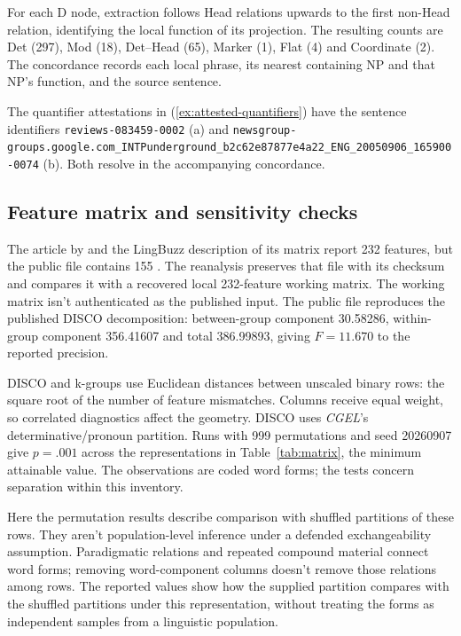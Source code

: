 \documentclass[12pt]{article}
\begin{document}
For each D node, extraction follows Head relations upwards to the first non-Head relation, identifying the local function of its projection. The resulting counts are Det (297), Mod (18), Det--Head (65), Marker (1), Flat (4) and Coordinate (2). The concordance records each local phrase, its nearest containing NP and that NP's function, and the source sentence.

The quantifier attestations in (\ref{ex:attested-quantifiers}) have the sentence identifiers \nolinkurl{reviews-083459-0002} (a) and \nolinkurl{newsgroup-groups.google.com_INTPunderground_b2c62e87877e4a22_ENG_20050906_165900-0074} (b). Both resolve in the accompanying concordance.

\subsection{Feature matrix and sensitivity checks}

The article by \textcite{reynolds2021} and the LingBuzz description of its matrix report 232 features, but the public file contains 155 \citep{reynolds2021matrixpublic}. The reanalysis preserves that file with its checksum and compares it with a recovered local 232-feature working matrix. The working matrix isn't authenticated as the published input. The public file reproduces the published DISCO decomposition: between-group component 30.58286, within-group component 356.41607 and total 386.99893, giving $F=11.670$ to the reported precision.

DISCO and k-groups use Euclidean distances between unscaled binary rows: the square root of the number of feature mismatches. Columns receive equal weight, so correlated diagnostics affect the geometry. DISCO uses \textit{CGEL}'s determinative/pronoun partition. Runs with 999 permutations and seed 20260907 give \mbox{$p=.001$} across the representations in Table~\ref{tab:matrix}, the minimum attainable value. The observations are coded word forms; the tests concern separation within this inventory.

Here the permutation results describe comparison with shuffled partitions of these rows. They aren't population-level inference under a defended exchangeability assumption. Paradigmatic relations and repeated compound material connect word forms; removing word-component columns doesn't remove those relations among rows. The reported values show how the supplied partition compares with the shuffled partitions under this representation, without treating the forms as independent samples from a linguistic population.
\end{document}
